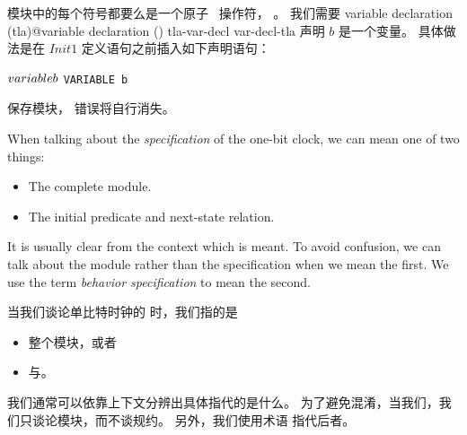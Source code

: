 \begin{ch}
  模块中的每个符号都要么是一个原子 \tlaplus\ 操作符，
  。
  我们需要
     {variable declaration (tla)@variable declaration ()}%
     {tla-var-decl}%
     {var-decl-tla}%
  声明 $b$ 是一个变量。
  具体做法是在 $Init1$ 定义语句之前插入如下声明语句：%
  \begin{display}
  \begin{twocols}
  $\VARIABLE b$ %
  \midcol \verb|VARIABLE b|
  \end{twocols}
  \end{display}
  保存模块，%
  错误将自行消失。
\end{ch}

\pause
%
\noindent
%
\begin{en}
When talking about the 
\emph{specification} of the one-bit clock, we
can mean one of two things:
\begin{itemize}
\item The complete module.  

\item The initial predicate and next-state relation.
\end{itemize}
It is usually clear from the context which is meant.  To avoid
confusion, we can talk about the module rather than the specification
when we mean the first.  We use the term
\emph{behavior specification} to mean the second.
\end{en}

\begin{ch}
  当我们谈论单比特时钟的%
  \emph{\tlaspec}时，我们指的是
  \begin{itemize}
    \item 整个模块，或者
    \item \tlainitpredicate{}与\tlanextstaterelation{}。
  \end{itemize}
  我们通常可以依靠上下文分辨出具体指代的是什么。
  为了避免混淆，当我们，我们只谈论模块，而不谈规约。
  另外，我们使用术语%
  \emph{\tlabehaviorspec}指代后者。
\end{ch}

